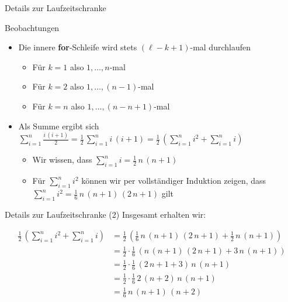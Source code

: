 \begin{frame}{Details zur Laufzeitschranke}
    \begin{block}{Beobachtungen}
        \begin{itemize}
            \item Die innere \textbf{for}-Schleife wird stets $(\ell - k + 1)$-mal durchlaufen
            \begin{itemize}
                \item F\"ur $k = 1$ also $1, \dots, n$-mal
                \item F\"ur $k = 2$ also $1, \dots, (n-1)$-mal
                \item F\"ur $k = n$ also $1, \dots, (n-n+1)$-mal
            \end{itemize}
            \item Als Summe ergibt sich $\sum_{i=1}^n \frac{i \, (i+1)}{2} = \frac{1}{2} \, \sum_{i=1}^n i \, (i+1) = \frac{1}{2} \, \left(\sum_{i=1}^n i^2 + \sum_{i=1}^n i \right)$
            \begin{itemize}
                \item Wir wissen, dass $\sum_{i=1}^n i = \frac{1}{2} \, n \, (n+1)$
                \item F\"ur $\sum_{i=1}^n i^2$ k\"onnen wir per vollst\"andiger Induktion zeigen, dass $\sum_{i=1}^n i^2 = \frac{1}{6} \, n \, (n + 1) \, (2 \, n + 1)$ gilt
            \end{itemize}
        \end{itemize}
    \end{block}
\end{frame}

\begin{frame}{Details zur Laufzeitschranke (2)}
    Insgesamt erhalten wir:
    
    \begin{align*}
        \frac{1}{2} \, \left(\sum_{i=1}^n i^2 + \sum_{i=1}^n i \right) &= \frac{1}{2} \, \left(\frac{1}{6} \, n \, (n + 1) \, (2 \, n + 1) + \frac{1}{2} \, n \, (n+1) \right) \\
        &= \frac{1}{2} \cdot \frac{1}{6} \, \left( n \, (n+1) \, (2\,n+1) + 3 \, n \, (n+1) \right) \\
        &= \frac{1}{2} \cdot \frac{1}{6} \, (2\,n+1+3) \, n \, (n+1) \\
        &= \frac{1}{2} \cdot \frac{1}{6} \, 2\, (n+2) \, n \, (n+1) \\
        &= \frac{1}{6} \, n \, (n+1) \, (n+2)
    \end{align*}
\end{frame}

